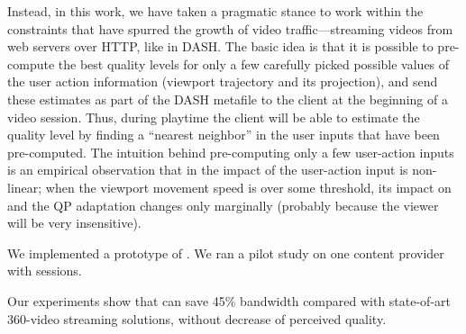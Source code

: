 Instead, in this work, we have taken a pragmatic stance to work within the constraints that have spurred the growth of video traffic---streaming videos from web servers over HTTP, like in DASH.
The basic idea is that it is possible to pre-compute the best quality levels for only a few carefully picked possible values of the user action information (viewport trajectory and its projection), and send these estimates as part of the DASH metafile to the client at the beginning of a video session. 
Thus, during playtime the client will be able to estimate the quality level by finding a ``nearest neighbor'' in the user inputs that have been pre-computed. 
The intuition behind pre-computing only a few user-action inputs is an empirical observation that in \vrjnd the impact of the user-action input is non-linear; \eg when the viewport movement speed is over some threshold, its impact on \vrjnd and the QP adaptation changes only marginally (probably because the viewer will be very insensitive).


\vspace{0.2cm}
We implemented a prototype of \name.
We ran a pilot study on one content provider with \fillme sessions. 

Our experiments show that \name can save 45\% bandwidth compared with state-of-art 360-video streaming solutions, without decrease of perceived quality.

